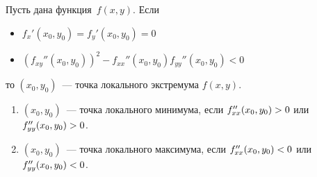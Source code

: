 \begin{theorem}
Пусть дана функция~$f(x, y)$. Если
\begin{itemize}
	\item $\displaystyle f_x'(x_0, y_0) = f_y'(x_0, y_0) = 0$
	\item $\displaystyle (f_{xy}''(x_0, y_0))^2 - f_{xx}''(x_0, y_0) f_{yy}''(x_0, y_0) < 0$
\end{itemize}
то $(x_0, y_0)$~--- точка локального экстремума $f(x, y)$.
	
\begin{enumerate}
	\item $(x_0, y_0)$~--- точка локального минимума,
	если $f_{xx}''(x_0, y_0) \opbr> 0$ или~$f_{yy}''(x_0, y_0) \opbr> 0$.
	\item $(x_0, y_0)$~--- точка локального максимума,
	если $f_{xx}''(x_0, y_0) \opbr< 0$ или~$f_{yy}''(x_0, y_0) \opbr< 0$.
\end{enumerate}
\end{theorem}
